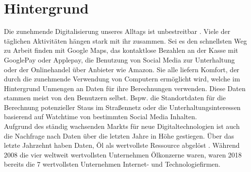 \documentclass[11pt,a4paper]{scrreprt}
\begin{document}
\chapter{Hintergrund}
Die zunehmende Digitalisierung unseres Alltags ist unbestreitbar \cite{dt-digitalisierung-stat}. Viele der täglichen Aktivitäten hängen stark mit ihr zusammen. Sei es den schnellsten Weg zu Arbeit finden mit Google Maps, das kontaktlose Bezahlen an der Kasse mit GooglePay oder Applepay, die Benutzung von Social Media zur Unterhaltung oder der Onlinehandel über Anbieter wie Amazon. Sie alle liefern Komfort, der durch die zunehmende Verwendung von Computern ermöglicht wird, welche im Hintergrund Unmengen an Daten für ihre Berechnungen verwenden. Diese Daten stammen meist von den Benutzern selbst. Bspw. die Standortdaten für die Berechnung potenzieller Staus im Straßennetz \cite{dt-googlemaps-staus} oder die Unterhaltungsinteressen basierend auf Watchtime von bestimmten Social Media Inhalten. \\
Aufgrund des ständig wachsenden Markts für neue Digitaltechnologien ist auch die Nachfrage nach Daten über die letzten Jahre in Höhe gestiegen. Über das letzte Jahrzehnt haben Daten, Öl als wertvollste Ressource abgelöst \cite{dt-falck2020rohstoff}. Während 2008 die vier weltweit wertvollsten Unternehmen Ölkonzerne waren, waren 2018 bereits die 7 wertvollsten Unternehmen Internet- und Technologiefirmen. 
\end{document}
